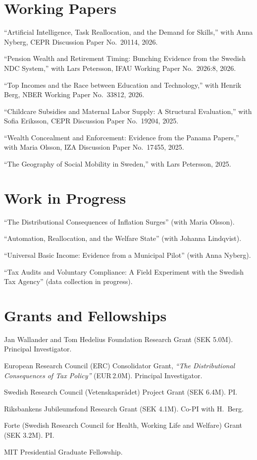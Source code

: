 \documentclass[11pt]{article}
\newcommand{\NEW}[1]{\textcolor{newgreen}{#1}}%
\newcommand{\NEW}[1]{#1}%
\newcommand{\dated}[2]{%
  \noindent\makebox[5.2em][l]{\textcolor{mutedgray}{#1}}%
  \begin{minipage}[t]{\dimexpr\linewidth-5.4em\relax}#2\end{minipage}\par\vspace{3pt}}
\newcommand{\pubitem}[1]{\item #1}
\begin{document}
\section{Working Papers}
\begin{cvlist}
\pubitem{\NEW{``Artificial Intelligence, Task Reallocation, and the Demand for Skills,'' with Anna Nyberg, CEPR Discussion Paper No.\ 20114, 2026.}}
\pubitem{\NEW{``Pension Wealth and Retirement Timing: Bunching Evidence from the Swedish NDC System,'' with Lars Petersson, IFAU Working Paper No.\ 2026:8, 2026.}}
\pubitem{``Top Incomes and the Race between Education and Technology,'' with Henrik Berg, NBER Working Paper No.\ 33812, 2026.}
\pubitem{``Childcare Subsidies and Maternal Labor Supply: A Structural Evaluation,'' with Sofia Eriksson, CEPR Discussion Paper No.\ 19204, 2025.}
\pubitem{``Wealth Concealment and Enforcement: Evidence from the Panama Papers,'' with Maria Olsson, IZA Discussion Paper No.\ 17455, 2025.}
\pubitem{``The Geography of Social Mobility in Sweden,'' with Lars Petersson, 2025.}
\end{cvlist}

\section{Work in Progress}
\begin{cvlist}
\pubitem{\NEW{``The Distributional Consequences of Inflation Surges'' (with Maria Olsson).}}
\pubitem{``Automation, Reallocation, and the Welfare State'' (with Johanna Lindqvist).}
\pubitem{``Universal Basic Income: Evidence from a Municipal Pilot'' (with Anna Nyberg).}
\pubitem{``Tax Audits and Voluntary Compliance: A Field Experiment with the Swedish Tax Agency'' (data collection in progress).}
\end{cvlist}

\section{Grants and Fellowships}
\dated{\NEW{2026--29}}{\NEW{Jan Wallander and Tom Hedelius Foundation Research Grant (SEK 5.0M). Principal Investigator.}}
\dated{2024--29}{European Research Council (ERC) Consolidator Grant, \emph{``The Distributional Consequences of Tax Policy''} (EUR\,2.0M). Principal Investigator.}
\dated{2022--26}{Swedish Research Council (Vetenskapsr\aa det) Project Grant (SEK 6.4M). PI.}
\dated{2020--23}{Riksbankens Jubileumsfond Research Grant (SEK 4.1M). Co-PI with H.\ Berg.}
\dated{2018--21}{Forte (Swedish Research Council for Health, Working Life and Welfare) Grant (SEK 3.2M). PI.}
\dated{2010--11}{MIT Presidential Graduate Fellowship.}
\end{document}
